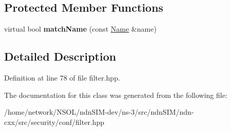 \subsection*{Protected Member Functions}
\begin{DoxyCompactItemize}
\item 
virtual bool {\bfseries match\+Name} (const \hyperlink{classndn_1_1Name}{Name} \&name)\hypertarget{classndn_1_1security_1_1conf_1_1RelationNameFilter_a626b97a0e17f1efdd7c2eb942c0f0852}{}\label{classndn_1_1security_1_1conf_1_1RelationNameFilter_a626b97a0e17f1efdd7c2eb942c0f0852}

\end{DoxyCompactItemize}


\subsection{Detailed Description}


Definition at line 78 of file filter.\+hpp.



The documentation for this class was generated from the following file\+:\begin{DoxyCompactItemize}
\item 
/home/network/\+N\+S\+O\+L/ndn\+S\+I\+M-\/dev/ns-\/3/src/ndn\+S\+I\+M/ndn-\/cxx/src/security/conf/filter.\+hpp\end{DoxyCompactItemize}
